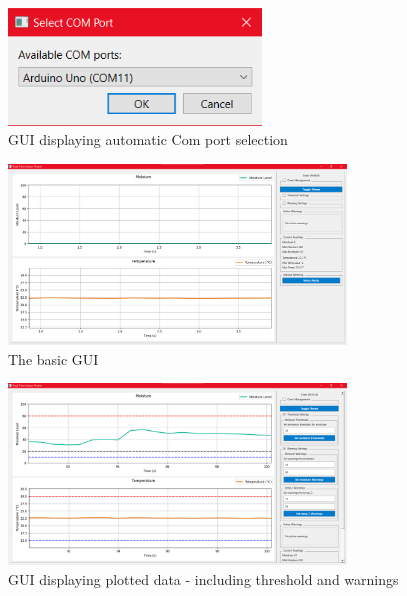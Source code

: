\documentclass[a4paper,11pt]{article}
\begin{document}
\begin{figure}[H]
    \centering
    \includegraphics[width=0.6\textwidth]{1 - Select Comm Port.png}
    \caption{GUI displaying automatic Com port selection}
    \label{fig:port}
\end{figure}

\begin{figure}[H]
    \centering
    \includegraphics[width=0.8\textwidth]{2 - Blank Chart.png}
    \caption{The basic GUI}
    \label{fig:blank_gui}
\end{figure}

\begin{figure}[H]
    \centering
    \includegraphics[width=0.8\textwidth]{3 - Threshold Setting.png}
    \caption{GUI displaying plotted data - including threshold and warnings}
    \label{fig:plotted}
\end{figure}
\end{document}
